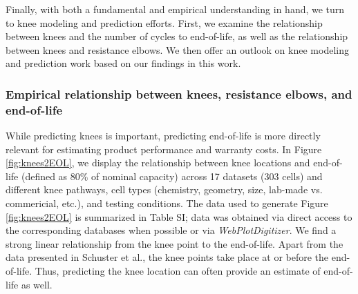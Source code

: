\documentclass[journal=jpclcd,manuscript=article]{achemso}
\newcommand{\ssri}[1]{{
\fbox{
\parbox{0.8\textwidth}{  \fbox{$\triangleright$\textcolor{blue}{\textbf{Shashank}:}} 
#1
}}}}
\newcommand{\pbox}[1]{{
\fbox{
\parbox{0.8\textwidth}{  \fbox{$\triangleright$\textcolor{blue}{\textbf{Peter}:}} 
#1
}}}}
\begin{document}
Finally, with both a fundamental and empirical understanding in hand, we turn to knee modeling and prediction efforts.
First, we examine the relationship between knees and the number of cycles to end-of-life, as well as the relationship between knees and resistance elbows.
We then offer an outlook on knee modeling and prediction work based on our findings in this work.


\subsubsection{Empirical relationship between knees, resistance elbows, and end-of-life}

While predicting knees is important, predicting end-of-life is more directly relevant for estimating product performance and warranty costs. In Figure \ref{fig:knees2EOL}, we display the relationship between knee locations and end-of-life (defined as 80\% of nominal capacity) across 17 datasets (303 cells) and different knee pathways, cell types (chemistry, geometry, size, lab-made vs. commericial, etc.), and testing conditions. The data used to generate Figure \ref{fig:knees2EOL} is summarized in Table SI; data was obtained via direct access to the corresponding databases when possible\cite{baumhofer_production_2014,diao_accelerated_2019,severson_data-driven_2019,willenberg_high-precision_2020,attia_closed-loop_2020} or via \textit{WebPlotDigitizer}\cite{dos_reis_lithium-ion_2021}.
We find a strong linear relationship from the knee point to the end-of-life. Apart from the data presented in Schuster et al.\cite{schuster_nonlinear_2015}, the knee points take place at or before the end-of-life.
Thus, predicting the knee location can often provide an estimate of end-of-life as well.
\end{document}
